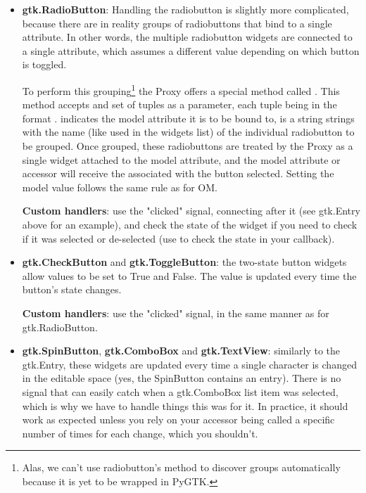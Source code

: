 \documentclass[a4paper]{howto}
\begin{document}
\begin{itemize}
{\bf Custom handlers}: as stated above, use 's
 parameter to specify a handler for the OptionMenu.
There is no signal you can connect to directly in GTK+ 1.2.

\item {\bf gtk.RadioButton}: Handling the radiobutton is slightly more
complicated, because there are in reality groups of radiobuttons that
bind to a single attribute. In other words, the multiple radiobutton
widgets are connected to a single attribute, which assumes a different
value depending on which button is toggled.

To perform this grouping\footnote{Alas, we can't use radiobutton's
 method to discover groups automatically because it is yet
to be wrapped in PyGTK.} the Proxy offers a special method called
. This method accepts  and set of
tuples as a parameter, each tuple being in the format .  indicates the model
attribute it is to be bound to,  is a string strings
with the name (like used in the widgets list) of the individual
radiobutton to be grouped. Once grouped, these radiobuttons are treated
by the Proxy as a single widget attached to the model attribute, and the
model attribute or accessor will receive the 
associated with the button selected. Setting the model value follows the
same rule as for OM.

{\bf Custom handlers}: use the "clicked" signal, connecting after it
(see gtk.Entry above for an  example), and check the
state of the widget if you need to check if it was selected or
de-selected (use  to check the state in your
callback).

\item {\bf gtk.CheckButton} and {\bf gtk.ToggleButton}: the two-state
button widgets allow values to be set to True and False.
The value is updated every time the button's state changes.

{\bf Custom handlers}: use the "clicked" signal, in the same manner as
for gtk.RadioButton.

\item {\bf gtk.SpinButton}, {\bf gtk.ComboBox} and {\bf gtk.TextView}:
similarly to the gtk.Entry, these widgets are updated every time a
single character is changed in the editable space (yes, the SpinButton
contains an entry). There is no signal that can easily catch when a
gtk.ComboBox list item was selected, which is why we have to handle
things this was for it. In practice, it should work as expected unless
you rely on your accessor being called a specific number of times for
each change, which you shouldn't.


\end{itemize}
\end{document}

